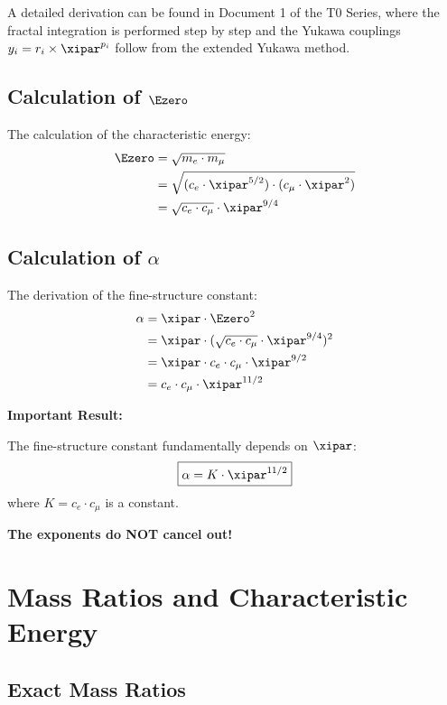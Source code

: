  A detailed derivation can be found in Document 1 of the T0 Series, where the fractal integration is performed step by step and the Yukawa couplings $y_i = r_i \times \xipar^{p_i}$ follow from the extended Yukawa method.
	
	\subsection{Calculation of $\Ezero$}
	
	The calculation of the characteristic energy:
	\begin{align}
		\Ezero &= \sqrt{m_e \cdot m_\mu} \\
		&= \sqrt{(c_e \cdot \xipar^{5/2}) \cdot (c_\mu \cdot \xipar^2)} \\
		&= \sqrt{c_e \cdot c_\mu} \cdot \xipar^{9/4}
	\end{align}
	
	\subsection{Calculation of $\alpha$}
	
	The derivation of the fine-structure constant:
	\begin{align}
		\alpha &= \xipar \cdot \Ezero^2 \\
		&= \xipar \cdot (\sqrt{c_e \cdot c_\mu} \cdot \xipar^{9/4})^2 \\
		&= \xipar \cdot c_e \cdot c_\mu \cdot \xipar^{9/2} \\
		&= c_e \cdot c_\mu \cdot \xipar^{11/2}
	\end{align}
	
	\begin{warning}
		\textbf{Important Result:}
		
		The fine-structure constant fundamentally depends on $\xipar$:
		\begin{equation}
			\boxed{\alpha = K \cdot \xipar^{11/2}}
		\end{equation}
		where $K = c_e \cdot c_\mu$ is a constant.
		
		\textbf{The exponents do NOT cancel out!}
	\end{warning}
	
	\section{Mass Ratios and Characteristic Energy}
	
	\subsection{Exact Mass Ratios}
	
